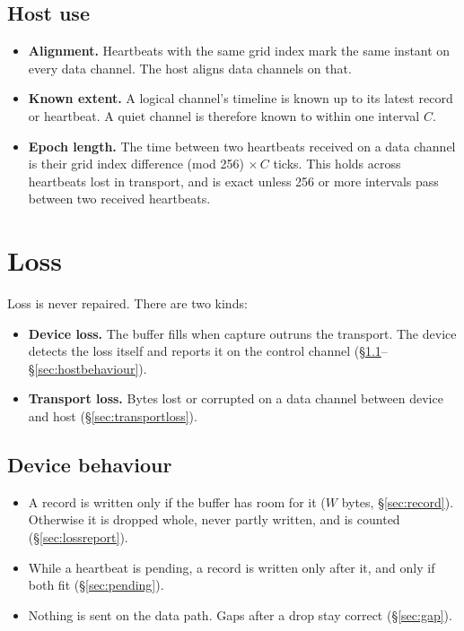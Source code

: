 \documentclass[11pt,a4paper]{article}
\newcommand{\sref}[1]{\S\ref{#1}}
\begin{document}
\subsection{Host use}\label{sec:hostuse}

\begin{itemize}
  \item \textbf{Alignment.} Heartbeats with the same grid index mark the same instant
        on every data channel. The host aligns data channels on that.
  \item \textbf{Known extent.} A logical channel's timeline is known up to its latest
        record or heartbeat. A quiet channel is therefore known to within one interval
        $C$.
  \item \textbf{Epoch length.} The time between two heartbeats received on a data
        channel is their grid index difference (mod 256) $\times\, C$ ticks. This holds
        across heartbeats lost in transport, and is exact unless 256 or more intervals
        pass between two received heartbeats.
\end{itemize}

\section{Loss}\label{sec:loss}

Loss is never repaired. There are two kinds:
\begin{itemize}
  \item \textbf{Device loss.} The buffer fills when capture outruns the transport. The
        device detects the loss itself and reports it on the control channel
        (\sref{sec:devicebehaviour}--\sref{sec:hostbehaviour}).
  \item \textbf{Transport loss.} Bytes lost or corrupted on a data channel between
        device and host (\sref{sec:transportloss}).
\end{itemize}

\subsection{Device behaviour}\label{sec:devicebehaviour}

\begin{itemize}
  \item A record is written only if the buffer has room for it ($W$ bytes,
        \sref{sec:record}). Otherwise it is dropped whole, never partly written, and
        is counted (\sref{sec:lossreport}).
  \item While a heartbeat is pending, a record is written only after it, and only if
        both fit (\sref{sec:pending}).
  \item Nothing is sent on the data path. Gaps after a drop stay correct
        (\sref{sec:gap}).
\end{itemize}
\end{document}
